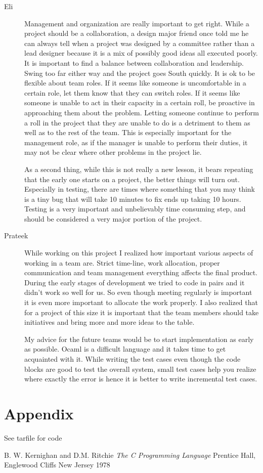 \documentclass[a4paper]{article}
\begin{document}
\begin{description}
\item[Eli]
\par Management and organization are really important to get right. While a project should be a collaboration, a design major friend once told me he can always tell when a project was designed by a committee rather than a lead designer because it is a mix of possibly good ideas all executed poorly. It is important to find a balance between collaboration and leadership. Swing too far either way and the project goes South quickly. It is ok to be flexible about team roles. If it seems like someone is uncomfortable in a certain role, let them know that they can switch roles. If it seems like someone is unable to act in their capacity in a certain roll, be proactive in approaching them about the problem. Letting someone continue to perform a roll in the project that they are unable to do is a detriment to them as well as to the rest of the team. This is especially important for the management role, as if the manager is unable to perform their duties, it may not be clear where other problems in the project lie.
\par As a second thing, while this is not really a new lesson, it bears repeating that the early one starts on a project, the better things will turn out. Especially in testing, there are times where something that you may think is a tiny bug that will take 10 minutes to fix ends up taking 10 hours. Testing is a very important and unbelievably time consuming step, and should be considered a very major portion of the project.

\item[Prateek]
\par While working on this project I realized how important various aspects of working in a team are. Strict time-line, work allocation, proper communication and team management everything affects the final product. During the early stages of development we tried to code in pairs and it didn't work so well for us. So even though meeting regularly is important it is even more important to allocate the work properly. I also realized that for a project of this size it is important that the team members should take initiatives and bring more and more ideas to the table.
\par My advice for the future teams would be to start implementation as early as possible. Ocaml is a difficult language and it takes time to get acquainted with it. While writing the test cases even though the code blocks are good to test the overall system, small test cases help you realize where exactly the error is hence it is better to write incremental test cases.

\end{description}

\section{Appendix}
See tarfile for code
\begin{thebibliography}{9}
\bibitem{}
B. W. Kernighan and D.M. Ritchie
\emph{The C Programming Language}
Prentice Hall, Englewood Cliffs New Jersey
1978
\end{thebibliography}
\end{document}

